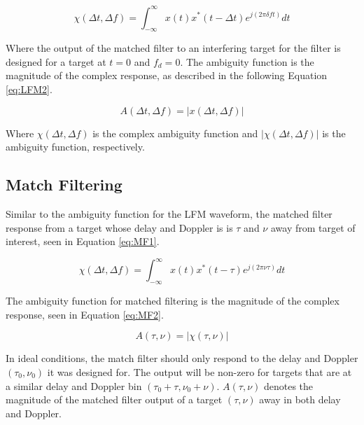 \documentclass{article}
\begin{document}
\begin{equation}
    \chi(\Delta t, \Delta f) = \int_{-\infty}^{\infty} x(t) x^*(t-\Delta t)e^{j(2\pi \delta ft)} dt
    \label{eq:LFM1}
\end{equation}

Where the output of the matched filter to an interfering target for the filter is designed for a target at $t = 0$ and $f_d = 0$. The ambiguity function is the magnitude of the complex response, as described in the following Equation \ref{eq:LFM2}.

\begin{equation}
    A(\Delta t, \Delta f) = \lvert x(\Delta t, \Delta f) \rvert
    \label{eq:LFM2}
\end{equation}

Where $\chi(\Delta t, \Delta f)$ is the complex ambiguity function and $\lvert \chi(\Delta t, \Delta f) \rvert$ is the ambiguity function, respectively.

\subsection{Match Filtering}
Similar to the ambiguity function for the LFM waveform, the matched filter response from a target whose delay and Doppler is is $\tau$ and $\nu$ away from target of interest, seen in Equation \ref{eq:MF1}.

\begin{equation}
    \chi(\Delta t, \Delta f) = \int_{-\infty}^{\infty} x(t)x^*(t-\tau)e^{j(2\pi\nu\tau)} dt
    \label{eq:MF1}
\end{equation}

The ambiguity function for matched filtering is the magnitude of the complex response, seen in Equation \ref{eq:MF2}.

\begin{equation}
    A(\tau, \nu) = \lvert \chi(\tau, \nu) \rvert
    \label{eq:MF2}
\end{equation}

In ideal conditions, the match filter should only respond to the delay and Doppler $( \tau_0, \nu_0)$ it was designed for. The output will be non-zero for targets that are at a similar delay and Doppler bin $( \tau_0 + \tau, \nu_0 + \nu)$. $A(\tau, \nu)$ denotes the magnitude of the matched filter output of a target $( \tau, \nu)$ away in both delay and Doppler.
\end{document}
